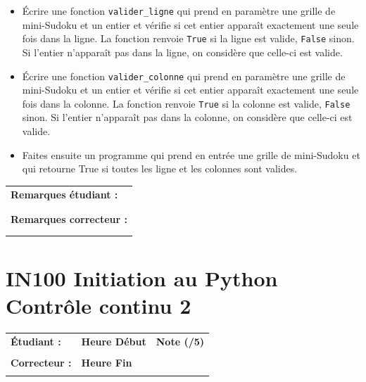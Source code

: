 \documentclass[a4paper,11pt]{article}
\begin{document}
\begin{itemize}
\item[1.] Écrire une fonction
\texttt{valider\_ligne} qui prend en paramètre une grille de mini-Sudoku et un entier et vérifie si cet entier apparaît exactement 
une seule fois dans la ligne. La fonction renvoie \texttt{True} si la ligne est valide, \texttt{False} sinon. Si l'entier n'apparaît pas dans la ligne, on 
considère que celle-ci est valide. 

\item[2.] Écrire une fonction
\texttt{valider\_colonne} qui prend en paramètre une grille de mini-Sudoku et un entier et vérifie si cet entier apparaît exactement
une seule fois dans la colonne.  La fonction renvoie \texttt{True} si la colonne est valide, \texttt{False} sinon. Si l'entier n'apparaît pas dans la colonne, on 
considère que celle-ci est valide. 

\item[3.] Faites ensuite un programme qui prend en entrée une grille de mini-Sudoku et qui
retourne True si toutes les ligne et les colonnes sont valides. 

\end{itemize}

\begin{table}[h!]
\centering
\renewcommand{\arraystretch}{1.4} %
\begin{tabular}{|p{15cm}|}
\hline
\textbf{Remarques étudiant :}    \\
 \\
 \\
\hline
\textbf{Remarques correcteur :}  \\
 \\
 \\
\hline
\end{tabular}
\end{table}

\newpage


\section*{\center IN100 Initiation au Python\\
Contrôle continu 2}


\begin{table}[h!]
\centering
\renewcommand{\arraystretch}{1.4} %
\begin{tabular}{|p{10cm}|p{3cm}|p{2cm}|}
\hline
\textbf{Étudiant :} & \textbf{Heure Début }  & \textbf{Note (/5) }  \\
& & \\
\hline
\textbf{Correcteur :} & \textbf{Heure Fin } & \\
& & \\
\hline

\hline
\end{tabular}
\end{table}
\end{document}
